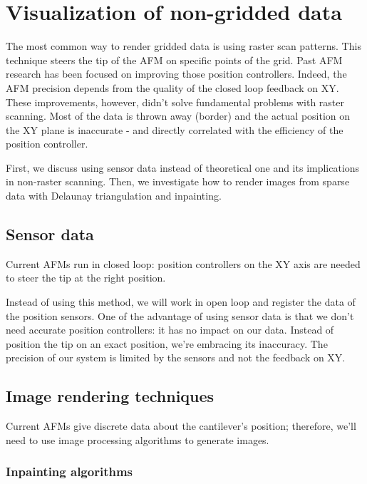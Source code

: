 \chapter{Visualization of non-gridded data}

The most common way to render gridded data is using raster scan patterns. This technique steers the tip of the AFM on specific points of the grid. Past AFM research has been focused on improving those position controllers. Indeed, the AFM precision depends from the quality of the closed loop feedback on XY. These improvements, however, didn't solve fundamental problems with raster scanning. Most of the data is thrown away (border) and the actual position on the XY plane is inaccurate - and directly correlated with the efficiency of the position controller.

First, we discuss using sensor data instead of theoretical one and its implications in non-raster scanning. Then, we investigate how to render images from sparse data with Delaunay triangulation and inpainting. 

\section{Sensor data}
 
Current AFMs run in closed loop: position controllers on the XY axis are needed to steer the tip at the right position. 

Instead of using this method, we will work in open loop and register the data of the position sensors. One of the advantage of using sensor data is that we don't need accurate position controllers: it has no impact on our data. Instead of position the tip on an exact position, we're embracing its inaccuracy. The precision of our system is limited by the sensors and not the feedback on XY.

\section{Image rendering techniques}

Current AFMs give discrete data about the cantilever's position; therefore, we'll need to use image processing algorithms to generate images. 

\subsection{Inpainting algorithms}


